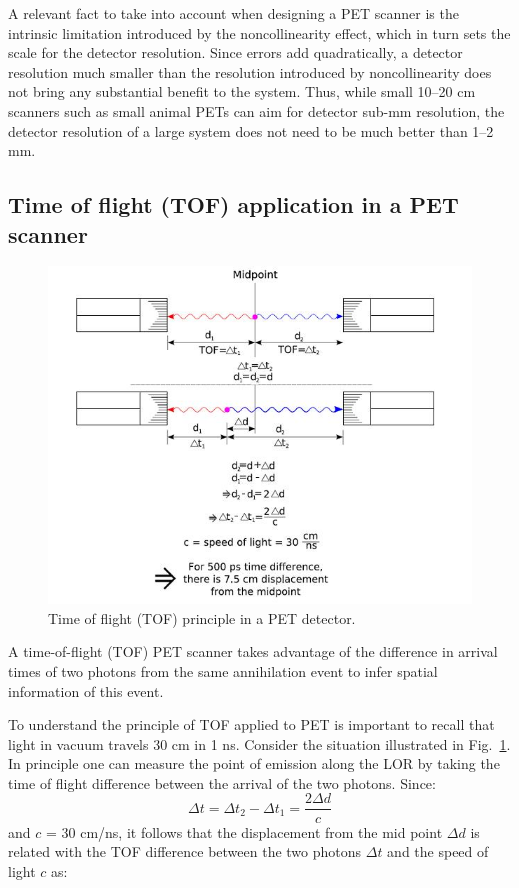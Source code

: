 \documentclass[review]{elsarticle}
\begin{document}
A relevant fact to take into account when designing a PET scanner is the intrinsic limitation introduced by the noncollinearity effect, which in turn sets the scale for the detector resolution. Since errors add quadratically, a detector resolution much smaller than the resolution introduced by noncollinearity does not bring any substantial benefit to the system. Thus, while small 10--20 cm scanners such as small animal PETs can aim for detector sub-mm resolution, the detector resolution of a large system does not need to be much better than 1--2 mm. 

\subsection*{Time of flight (TOF) application in a PET scanner}

\begin{figure}[!bthp]
	\centering
	\includegraphics[scale=0.8]{../img/MAPD_tofprinciple.jpg}
	\caption{\label{fig.tof} Time of flight (TOF) principle in a PET detector.}
\end{figure}

A time-of-flight (TOF) PET scanner takes advantage of the difference in arrival times of two photons from the same annihilation event to infer spatial information of this event. 

To understand the principle of TOF applied to PET is important to recall that light in vacuum travels 30 cm in 1 ns. Consider the situation illustrated in Fig.~\ref{fig.tof}. In principle one can measure the point of emission along the LOR by taking the time of flight difference between the arrival of the two photons. Since:
\begin{equation}
\Delta t = \Delta t_2 - \Delta t_1 = \frac{2 \Delta d}{c}
\end{equation}
%
and $c$ = 30 cm/ns, it follows that the displacement from the mid point
$\Delta d$ is related with the TOF difference between the two photons $\Delta t$ and the speed of light $c$ as:
\end{document}
